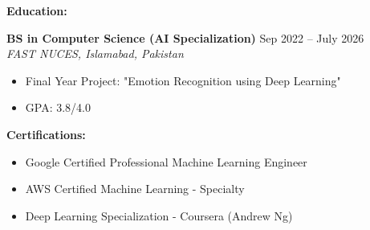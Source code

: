 \documentclass[a4paper,12pt]{article}
\begin{document}
\textbf{Education:}

\textbf{BS in Computer Science (AI Specialization)} \hfill Sep 2022 -- July 2026 \\
\textit{FAST NUCES, Islamabad, Pakistan}
\begin{itemize}[leftmargin=*]
    \item Final Year Project: "Emotion Recognition using Deep Learning"
    \item GPA: 3.8/4.0
\end{itemize}

\textbf{Certifications:}
\begin{itemize}[leftmargin=*]
    \item Google Certified Professional Machine Learning Engineer
    \item AWS Certified Machine Learning - Specialty
    \item Deep Learning Specialization - Coursera (Andrew Ng)
\end{itemize}
\end{document}
